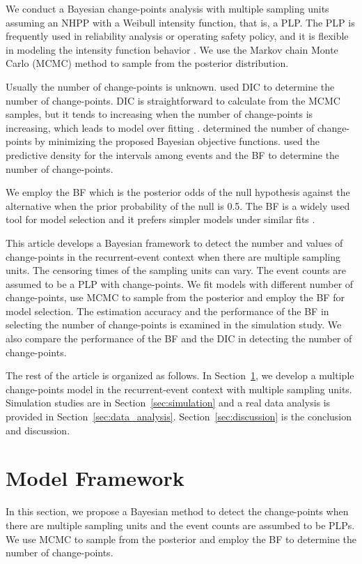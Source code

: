 \documentclass[12pt]{article}
\numberwithin{equation}{section}
\begin{document}
We conduct a Bayesian change-points analysis with multiple sampling units assuming an NHPP with a Weibull intensity function, that is, a PLP. The PLP is frequently used in reliability analysis or operating safety policy, and it is flexible in modeling the intensity function behavior \citep{Crow1975}. We use the Markov chain Monte Carlo (MCMC) method to sample from the posterior distribution. 

Usually the number of change-points is unknown. \citet{Cruz2016, Achcar2016} used  DIC to determine the number of change-points. DIC is straightforward to calculate from the MCMC samples, but it tends to increasing when the number of change-points is increasing, which leads to model over fitting \citep{Ando2010}. \citet{Montoya2017} determined the number of change-points by minimizing the proposed Bayesian objective functions. \citet{Achcar2007} used the predictive density for the intervals among events and the BF to determine the number of change-points. 
 
We employ the BF which is the posterior odds of the null hypothesis against the alternative when the prior probability of the null is 0.5. The BF is a widely used tool for model selection and it prefers simpler models under similar fits \citep{Kass1995}. 

This article develops a Bayesian framework to detect the number and values of change-points in the recurrent-event context when there are multiple sampling units. The censoring times of the sampling units can vary.  The event counts are assumed to be a PLP with change-points. We fit models with different number of change-points, use MCMC to sample from the posterior and employ the BF for model selection. The estimation accuracy and the performance of the BF in selecting the number of change-points is examined in the simulation study.  We also compare the performance of the BF and the DIC in detecting the number of change-points.

The rest of the article is organized as follows. In Section~\ref{sec:models}, we develop a multiple change-points model in the recurrent-event context with multiple sampling units. Simulation studies are in Section~\ref{sec:simulation} and a real data analysis is provided in Section~\ref{sec:data_analysis}. Section~\ref{sec:discussion} is the conclusion and discussion. %

\section{Model Framework}\label{sec:models}
In this section, we propose a Bayesian method to detect the change-points when there are multiple sampling units and the event counts are assumbed to be PLPs. We use MCMC to sample from the posterior and employ the BF to determine the number of change-points. 
\end{document}
